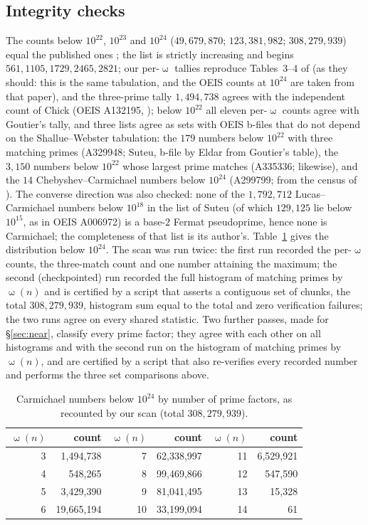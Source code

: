 \documentclass[11pt]{amsart}
\theoremstyle{definition}
\theoremstyle{remark}
\DeclareMathOperator{\omg}{\omega}
\begin{document}
\subsection*{Integrity checks} The counts below $10^{22}$, $10^{23}$ and $10^{24}$ ($49{,}679{,}870$; $123{,}381{,}982$; $308{,}279{,}939$) equal the published ones \cite{SW25}; the list is strictly increasing and begins $561,1105,1729,2465,2821$; our per-$\omg$ tallies reproduce Tables~3--4 of \cite{SW25} (as they should: this is the same tabulation, and the OEIS counts at $10^{24}$ are taken from that paper), and the three-prime tally $1{,}494{,}738$ agrees with the independent count of Chick (OEIS A132195, \cite{Chick}); below $10^{22}$ all eleven per-$\omg$ counts agree with Goutier's tally, and three lists agree as sets with OEIS b-files that do not depend on the Shallue--Webster tabulation: the $179$ numbers below $10^{22}$ with three matching primes (A329948; Suteu, b-file by Eldar from Goutier's table), the $3{,}150$ numbers below $10^{22}$ whose largest prime matches (A335336; likewise), and the $14$ Chebyshev--Carmichael numbers below $10^{24}$ (A299799; from the census of \cite{Pud28,Pud30}). The converse direction was also checked: none of the $1{,}792{,}712$ Lucas--Carmichael numbers below $10^{18}$ in the list of Suteu \cite{SuteuLC18} (of which $129{,}125$ lie below $10^{15}$, as in OEIS A006972) is a base-$2$ Fermat pseudoprime, hence none is Carmichael; the completeness of that list is its author's. Table~\ref{tab:omega} gives the distribution below $10^{24}$. The scan was run twice: the first run recorded the per-$\omg$ counts, the three-match count and one number attaining the maximum; the second (checkpointed) run recorded the full histogram of matching primes by $\omg(n)$ and is certified by a script that asserts a contiguous set of chunks, the total $308{,}279{,}939$, histogram sum equal to the total and zero verification failures; the two runs agree on every shared statistic. Two further passes, made for \S\ref{sec:near}, classify every prime factor; they agree with each other on all histograms and with the second run on the histogram of matching primes by $\omg(n)$, and are certified by a script that also re-verifies every recorded number and performs the three set comparisons above.

\begin{table}[h]
\centering\small
\begin{tabular}{rr@{\qquad}rr@{\qquad}rr}
\toprule
$\omg(n)$ & count & $\omg(n)$ & count & $\omg(n)$ & count\\
\midrule
3 & 1{,}494{,}738 & 7 & 62{,}338{,}997 & 11 & 6{,}529{,}921\\
4 & 548{,}265 & 8 & 99{,}469{,}866 & 12 & 547{,}590\\
5 & 3{,}429{,}390 & 9 & 81{,}041{,}495 & 13 & 15{,}328\\
6 & 19{,}665{,}194 & 10 & 33{,}199{,}094 & 14 & 61\\
\bottomrule
\end{tabular}
\caption{Carmichael numbers below $10^{24}$ by number of prime factors, as recounted by our scan (total $308{,}279{,}939$).}\label{tab:omega}
\end{table}
\end{document}
